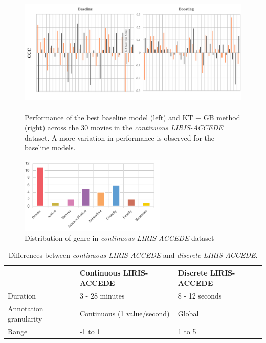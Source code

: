 \documentclass{article}
\begin{document}
\begin{figure}[t]
\includegraphics[width=\textwidth, height = 6cm]{images/comparison2.pdf}
\centering
\vspace{-11mm}
\caption{Performance of the best baseline model (left) and KT + GB method (right) across the 30 movies in the {\it continuous LIRIS-ACCEDE} dataset. A more variation in performance is observed for the baseline models.}
\label{comparison}
\end{figure}

\begin{figure}[t]
\includegraphics[width=7cm]{genre2}
\centering
\caption{Distribution of genre in {\it continuous LIRIS-ACCEDE} dataset}
\label{genre}
\end{figure}

\begin{table}[t]
\centering
\caption{Differences between {\it continuous LIRIS-ACCEDE} and {\it discrete LIRIS-ACCEDE}.}
\begin{tabular}{l|p{2.2cm}|p{2.2cm}}\hline
				& Continuous LIRIS-ACCEDE	& Discrete LIRIS-ACCEDE \\ \hline
Duration			& 3 - 28 minutes			& 8 - 12 seconds		\\ \hline	
Annotation granularity & Continuous (1 value/second)				& Global 				\\ \hline
Range			& -1 to 1					& 1 to 5				\\ 
\end{tabular}
\label{differences}
\end{table}
\end{document}
